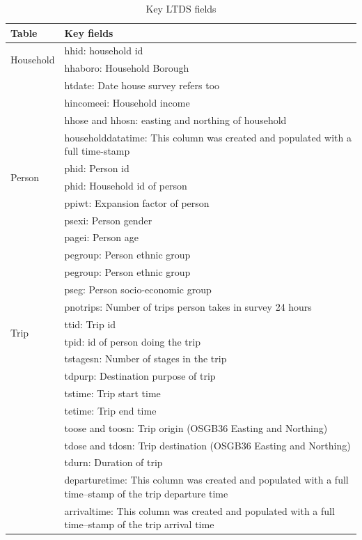 \begin{center}
\begin{table}[h!]
\caption{Key LTDS fields}
    \begin{tabular}{ | p{2.2cm} | p{12cm} |}
    \hline
    \textbf{Table} & \textbf{Key fields} \\ \hline
    \multirow{2}{*}{Household} & hhid: household id \\
     & hhaboro: Household Borough \\
     & htdate: Date house survey refers too \\
     & hincomeei: Household income \\
     & hhose and hhosn: easting and northing of household \\ 
     & householddatatime: This column was created and populated with a full time-stamp \\ \hline
   \multirow{2}{*}{Person} & phid: Person id \\
     & phid: Household id of person \\
     & ppiwt: Expansion factor of person \\
     & psexi: Person gender \\
     & pagei: Person age \\
     & pegroup: Person ethnic group \\
     & pegroup: Person ethnic group \\
     & pseg: Person socio-economic group \\
     & pnotrips: Number of trips person takes in survey 24 hours \\ \hline
     \multirow{2}{*}{Trip} & ttid: Trip id \\
     & tpid: id of person doing the trip \\
     & tstagesn: Number of stages in the trip  \\
     & tdpurp: Destination purpose of trip \\
     & tstime: Trip start time \\
     & tetime: Trip end time \\
     & toose and toosn: Trip origin (OSGB36 Easting and Northing) \\
     & tdose and tdosn: Trip destination (OSGB36 Easting and Northing) \\
     & tdurn: Duration of trip \\ 
     & departuretime: This column was created and populated with a full time--stamp of the trip departure time \\
     & arrivaltime: This column was created and populated with a full time--stamp of the trip arrival time \\ \hline

\end{tabular}
\end{table}
\end{center}
